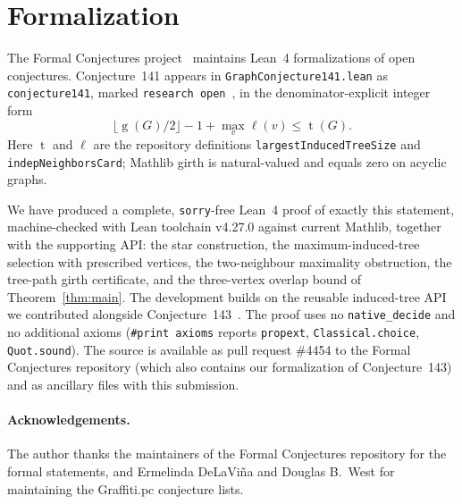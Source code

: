 \documentclass[11pt]{article}
\numberwithin{equation}{section}
\theoremstyle{remark}
\newcommand{\tr}{\operatorname{t}}
\newcommand{\gr}{\operatorname{g}}
\newcommand{\lv}{\ell}
\begin{document}
\section{Formalization}\label{sec:formal}

The Formal Conjectures project~\cite{FC} maintains Lean~4 formalizations of
open conjectures.  Conjecture~141 appears in \texttt{GraphConjecture141.lean}
as \texttt{conjecture141}, marked \texttt{research open}~\cite{FC141}, in
the denominator-explicit integer form
\[
  \lfloor\gr(G)/2\rfloor-1+\max_v\lv(v)\le\tr(G).
\]
Here $\tr$ and $\lv$ are the repository definitions
\texttt{largestInducedTree\allowbreak Size} and
\texttt{indepNeighbors\allowbreak Card}; Mathlib girth is natural-valued and
equals zero on acyclic graphs.

We have produced a complete, \texttt{sorry}-free Lean~4 proof of exactly this
statement, machine-checked with Lean toolchain v4.27.0 against current
Mathlib, together with the supporting API: the star construction, the
maximum-induced-tree selection with prescribed vertices, the two-neighbour
maximality obstruction, the tree-path girth certificate, and the
three-vertex overlap bound of Theorem~\ref{thm:main}.  The development
builds on the reusable induced-tree API we contributed alongside
Conjecture~143~\cite{W143}.  The proof uses no \texttt{native\_decide} and no
additional axioms (\texttt{\#print axioms} reports \texttt{propext},
\texttt{Classical.choice}, \texttt{Quot.sound}).  The source is available as
pull request \#4454 to the Formal Conjectures repository (which also contains
our formalization of Conjecture~143) and as ancillary files with this
submission.

\paragraph{Acknowledgements.}
The author thanks the maintainers of the Formal Conjectures repository for
the formal statements, and Ermelinda DeLaVi\~na and Douglas B.\ West for
maintaining the Graffiti.pc conjecture lists.
\end{document}
